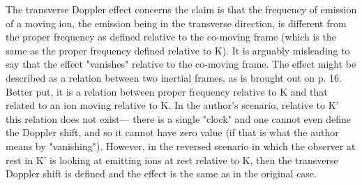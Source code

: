 \documentclass[submitted,11pt]{article}
\begin{document}
\begin{point}\label{vanish}
The transverse Doppler effect concerns the claim is that the frequency of emission of a moving ion, the emission being in the transverse direction, is different from the proper frequency as defined relative to the co-moving frame (which is the same as the proper frequency defined relative to K). It is arguably misleading to say that the effect "vanishes" relative to the co-moving frame. The effect might be described as a relation between two inertial frames, as is brought out on p. 16. Better put, it is a relation between proper frequency relative to K and that related to an ion moving relative to K. In the author's scenario, relative to K' this relation does not exist— there is a single "clock" and one cannot even define the Doppler shift, and so it cannot have zero value (if that is what the author means by "vanishing"). However, in the reversed scenario in which the observer at rest in K' is looking at emitting ions at rest relative to K, then the transverse Doppler shift
is defined and the effect is the same as in the original case.
\end{point}
\end{document}
